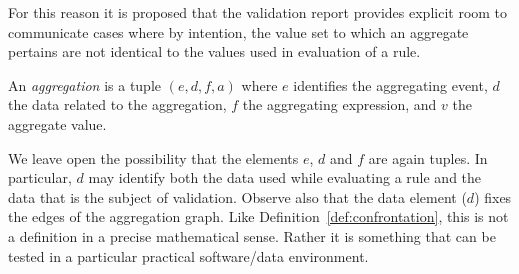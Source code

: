 For this reason it is proposed that the validation report provides explicit
room to communicate cases where by intention, the value set to which an
aggregate pertains are not identical to the values used in evaluation of a
rule. 
%
\begin{definition}[aggregation]
\label{def:aggregation}
An \emph{aggregation} is a tuple  
$(e, d, f, a)$
where $e$ identifies the aggregating event, $d$ the data related to the
aggregation, $f$ the aggregating expression, and $v$ the aggregate value.
\end{definition}
We leave open the possibility that the elements $e$, $d$ and $f$ are again
tuples. In particular, $d$ may identify both the data used while evaluating a
rule and the data that is the subject of validation.  Observe also that the
data element ($d$) fixes the edges of the aggregation graph.  Like
Definition~\ref{def:confrontation}, this is not a definition in a precise
mathematical sense. Rather it is something that can be tested in a particular
practical software/data environment. 


